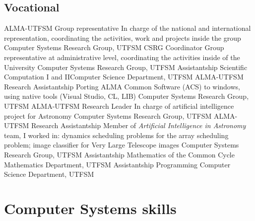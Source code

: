 \documentclass[11pt,a4paper]{moderncv}
\begin{document}
\subsection{Vocational}
	{ALMA-UTFSM Group representative}
	{In charge of the national and international representation, coordinating the activities, work and projects inside the group}
	{Computer Systems Research Group, UTFSM}
	{}{}
	{CSRG Coordinator}
    {Group representative at administrative level, coordinating the activities inside of the University}
	{Computer Systems Research Group, UTFSM}
	{}{}
	{Assistantship}
	{Scientific Computation I and II}{Computer Science Department, UTFSM}
	{}{}
	{ALMA-UTFSM Research Assistantship}
    {Porting ALMA Common Software (ACS) to windows, using native tools (Visual Studio, CL, LIB)}
	{Computer Systems Research Group, UTFSM}
	{}{}
	{ALMA-UTFSM Research Leader}
	{In charge of artificial intelligence project for Astronomy}
	{Computer Systems Research Group, UTFSM}
	{}{}
	{ALMA-UTFSM Research Assistantship}
    {Member of \emph{Artificial Intelligence in Astronomy} team, I worked in:
dynamics scheduling problems for the array scheduling problem; image classifier
for Very Large Telescope images}
	{Computer Systems Research Group, UTFSM}
	{}{}
	{Assistantship}
	{Mathematics of the Common Cycle}
	{Mathematics Department, UTFSM}
	{}{}
	{Assistantship}
	{Programming}
	{Computer Science Department, UTFSM}
	{}{}

\section{Computer Systems skills}
\end{document}
